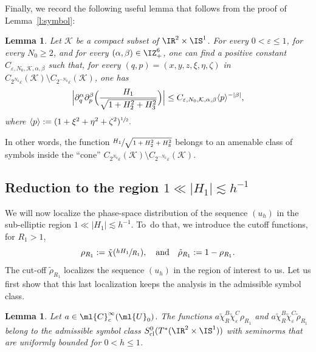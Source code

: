 \documentclass[JEP,XML,SOM,Unicode, NoEqCountersInSection,published]{cedram}
\theoremstyle{plain}
\newtheorem{lemm}[theo]{Lemma}
\theoremstyle{definition}
\theoremstyle{remark}
\begin{document}
Finally, we record the following useful lemma that follows from the proof of Lemma~\ref{l:symbol}:

\begin{lemm}\label{l:symbol-cone} Let $\mathcal{K}$ be a compact subset of $\IR^2\times\IS^1$. For every $0<\varepsilon\leq 1$, for every $N_0\geq 2$, and for every $(\alpha,\beta)\in\IZ_+^6$, one can find a positive constant $C_{\varepsilon, N_0, \mathcal{K}, \alpha,\beta}$ such that, for every $(q,p)=(x,y,z,\xi,\eta,\zeta)$ in $C_{2^{N_0}\varepsilon}(\mathcal{K})\setminus C_{2^{-N_0}\varepsilon}(\mathcal{K})$, one has
\[
\Bigl|\partial^\alpha_{q}\partial_{p}^\beta \Bigl(\frac{H_1}{\sqrt{1+H_2^2+H_3^2}}\Bigr)\Bigr|\leq C_{\varepsilon, N_0, \mathcal{K},\alpha,\beta}\langle p\rangle^{-|\beta|},
\]
where $\langle p\rangle:=(1+\xi^2+\eta^2+\zeta^2)^{\sfrac{1}{2}}.$
\end{lemm}
In other words, the function $\sfrac{H_1}{\sqrt{1+H_2^2+H_3^2}}$ belongs to an amenable class of symbols inside the ``cone'' $C_{2^{N_0}\varepsilon}(\mathcal{K})\setminus C_{2^{-N_0}\varepsilon}(\mathcal{K})$.

\subsection{Reduction to the region $ 1 \ll \vert H_1 \vert \lesssim h^{-1}$} \label{ss:largeH1}

We will now localize the phase-space distribution of the sequence $(u_h)$ in the sub-elliptic region $ 1 \ll \vert H_1 \vert \lesssim h^{-1}$. To~do that, we introduce the cutoff functions, for $R_1>1$,
\[
\rho_{R_1}:=\tilde{\chi}(\sfrac{hH_1}{R_1}),\quad \text{and}\quad \tilde{\rho}_{R_1}:=1-\rho_{R_1}.
\]
The cut-off $\tilde{\rho}_{R_1}$ localizes the sequence $(u_h)$ in the region of interest to us. Let us first show that this last localization keeps the analysis in the admissible symbol class.

\begin{lemm}\label{l:cutoffH1} Let $a\in\ml{C}^{\infty}_c(\ml{U}_0)$. The functions $a\tilde{\chi}_R^B\tilde{\chi}_\varepsilon^C\rho_{R_1}$ and $a\tilde{\chi}_R^B\tilde{\chi}_\varepsilon^C\tilde{\rho}_{R_1}$ belong to the admissible symbol class $S_{\operatorname{cl}}^0(T^*(\IR^2\times\IS^1))$ with seminorms that are uniformly bounded for $0<h\leq 1$.
\end{lemm}
\end{document}

